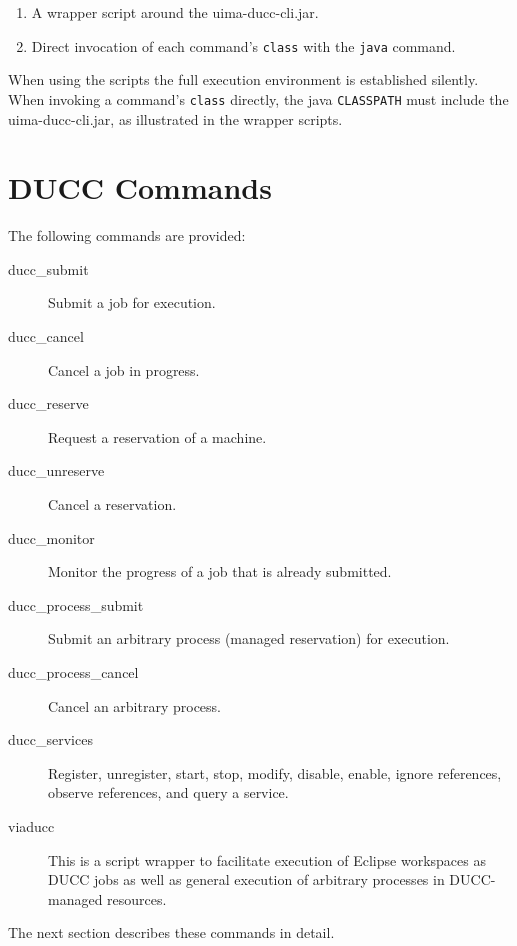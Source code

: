     \begin{enumerate}
      \item A wrapper script around the uima-ducc-cli.jar.
      \item Direct invocation of each command's {\tt class} with the {\tt java} command.
    \end{enumerate}

    When using the scripts the full execution environment is established
    silently.  When invoking a command's {\tt class} directly, the java {\tt CLASSPATH}
    must include the uima-ducc-cli.jar, as illustrated in the wrapper scripts.

    \section{DUCC Commands}
    The following commands are provided:
    \begin{description}
    \item[ducc\_submit] Submit a job for execution.
    \item[ducc\_cancel] Cancel a job in progress.
    \item[ducc\_reserve] Request a reservation of a machine.
    \item[ducc\_unreserve] Cancel a reservation.
    \item[ducc\_monitor] Monitor the progress of a job that is already submitted.
    \item[ducc\_process\_submit] Submit an arbitrary process (managed reservation) for execution.
    \item[ducc\_process\_cancel] Cancel an arbitrary process.
    \item[ducc\_services] Register, unregister, start, stop, modify, disable, enable, 
      ignore references, observe references, and query a service.
    \item[viaducc] This is a script wrapper to facilitate execution of Eclipse workspaces as
      DUCC jobs as well as general execution of arbitrary processes in DUCC-managed resources.
    \end{description}
    
    The next section describes these commands in detail.

    
    
    
    
    
    
    
    


